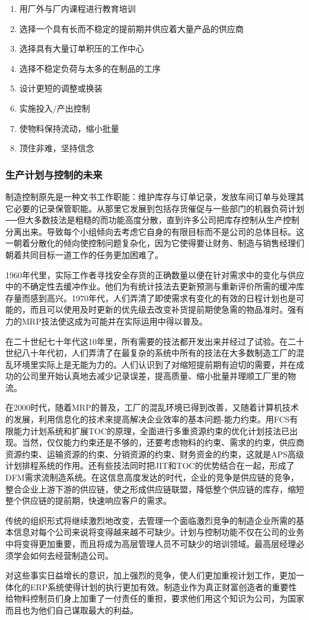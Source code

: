     \begin{enumerate}
        \item  用厂外与厂内课程进行教育培训
        \item  选择一个具有长而不稳定的提前期并供应着大量产品的供应商
        \item  选择具有大量订单积压的工作中心
        \item  选择不稳定负荷与太多的在制品的工序
        \item  设计更短的调整或换装
        \item  实施投入/产出控制
        \item  使物料保持流动，缩小批量
        \item  顶住非难，坚持信念
    \end{enumerate}

\subsubsection {生产计划与控制的未来}

    制造控制原先是一种文书工作职能：维护库存与订单记录，发放车间订单与处理其它必要的记录保管职能。从那里它发展到包括存货催促与一些部门的机器负荷计划──但大多数技法是粗糙的而功能高度分散，直到许多公司把库存控制从生产控制分离出来。导致每个小组倾向去考虑它自身的有限目标而不是公司的总体目标。这一朝着分散化的倾向使控制问题复杂化，因为它使得要让财务、制造与销售经理们朝着共同目标一道工作的任务更加困难了。

    1960年代里，实际工作者寻找安全存货的正确数量以便在针对需求中的变化与供应中的不确定性去缓冲作业。他们为有统计技法去更新预测与重新评价所需的缓冲库存量而感到高兴。1970年代，人们弄清了即使需求有变化的有效的日程计划也是可能的，而且可以使用及时更新的优先级去改变补货提前期使急需的物品准时。强有力的MRP技法使这成为可能并在实际运用中得以普及。

    在二十世纪七十年代这10年里，所有需要的技法都开发出来并经过了试验。在二十世纪八十年代初，人们弄清了在最复杂的系统中所有的技法在大多数制造工厂的混乱环境里实际上是无能为力的。人们认识到了对缩短提前期有迫切的需要，并在成功的公司里开始认真地去减少记录误差，提高质量、缩小批量并理顺工厂里的物流。

    在2000时代，随着MRP的普及，工厂的混乱环境已得到改善，又随着计算机技术的发展，利用信息化的技术来提高解决企业效率的基本问题-能力约束。用FCS有限能力计划系统和扩展TOC的原理，全面进行多重资源约束的优化计划技法已出现。当然，仅仅能力约束还是不够的，还要考虑物料的约束、需求的约束，供应商资源约束、运输资源的约束、分销资源的约束、财务资金的约束，这就是APS高级计划排程系统的作用。还有些技法同时把JIT和TOC的优势结合在一起，形成了DFM需求流制造系统。在这信息高度发达的时代，企业的竞争是供应链的竞争，整合企业上游下游的供应链，使之形成供应链联盟，降低整个供应链的库存，缩短整个供应链的提前期，快速响应客户的需求。

    传统的组织形式将继续激烈地改变，去管理一个面临激烈竞争的制造企业所需的基本信息对每个公司来说将变得越来越不可缺少。计划与控制功能不仅在公司的业务中将变得更加重要，而且将成为高层管理人员不可缺少的培训领域。最高层经理必须学会如何去经营制造公司。

    对这些事实日益增长的意识，加上强烈的竞争，使人们更加重视计划工作，更加一体化的ERP系统使得计划的执行更加有效。制造业作为真正财富创造者的重要性给物料控制员们身上加重了一付责任的重担，要求他们用这个知识为公司，为国家而且也为他们自己谋取最大的利益。
